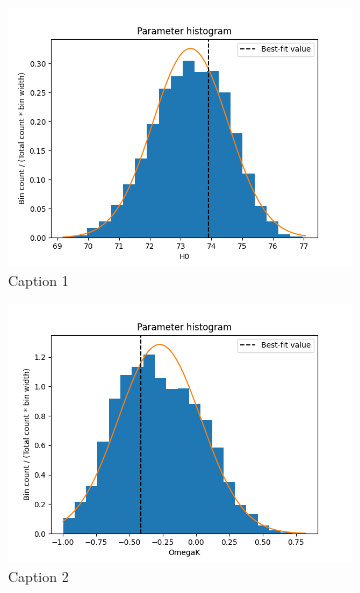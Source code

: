 \begin{appendix}
\begin{figure}[h!tb]
\centering
    \begin{subfigure}[t!]{0.4\textwidth}
    \centering
    \includegraphics[width=1.0\textwidth]{../Milestone 1/Plots/H0_histogram.png}
    \caption{Caption 1}
    \label{fig:milestone_1_H0_histogram}
    \end{subfigure}
    \begin{subfigure}[t!]{0.4\textwidth}
    \centering
    \includegraphics[width=1.0\textwidth]{../Milestone 1/Plots/OmegaK_histogram.png}
    \caption{Caption 2}
    \label{fig:milestone_1_OmegaK_histogram}
    \end{subfigure}
    \hfill
    \begin{subfigure}[b!]{0.4\textwidth}

\end{subfigure}
\end{figure}
\end{appendix}

